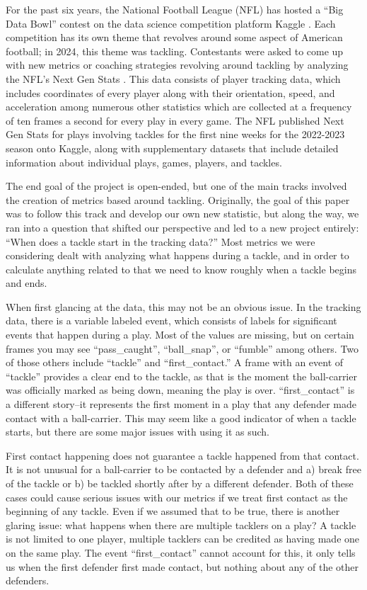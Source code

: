 \documentclass[
  12pt]{article}
\begin{document}
For the past six years, the National Football League (NFL) has hosted a
``Big Data Bowl'' contest on the data science competition platform
Kaggle \citep{BDB, Kaggle}. Each competition has its own theme that
revolves around some aspect of American football; in 2024, this theme
was tackling. Contestants were asked to come up with new metrics or
coaching strategies revolving around tackling by analyzing the NFL's
Next Gen Stats \citep{NextGenStats}. This data consists of player
tracking data, which includes coordinates of every player along with
their orientation, speed, and acceleration among numerous other
statistics which are collected at a frequency of ten frames a second for
every play in every game. The NFL published Next Gen Stats for plays
involving tackles for the first nine weeks for the 2022-2023 season onto
Kaggle, along with supplementary datasets that include detailed
information about individual plays, games, players, and tackles.

The end goal of the project is open-ended, but one of the main tracks
involved the creation of metrics based around tackling. Originally, the
goal of this paper was to follow this track and develop our own new
statistic, but along the way, we ran into a question that shifted our
perspective and led to a new project entirely: ``When does a tackle
start in the tracking data?'' Most metrics we were considering dealt
with analyzing what happens during a tackle, and in order to calculate
anything related to that we need to know roughly when a tackle begins
and ends.

When first glancing at the data, this may not be an obvious issue. In
the tracking data, there is a variable labeled event, which consists of
labels for significant events that happen during a play. Most of the
values are missing, but on certain frames you may see ``pass\_caught'',
``ball\_snap'', or ``fumble'' among others. Two of those others include
``tackle'' and ``first\_contact.'' A frame with an event of ``tackle''
provides a clear end to the tackle, as that is the moment the
ball-carrier was officially marked as being down, meaning the play is
over. ``first\_contact'' is a different story--it represents the first
moment in a play that any defender made contact with a ball-carrier.
This may seem like a good indicator of when a tackle starts, but there
are some major issues with using it as such.

First contact happening does not guarantee a tackle happened from that
contact. It is not unusual for a ball-carrier to be contacted by a
defender and a) break free of the tackle or b) be tackled shortly after
by a different defender. Both of these cases could cause serious issues
with our metrics if we treat first contact as the beginning of any
tackle. Even if we assumed that to be true, there is another glaring
issue: what happens when there are multiple tacklers on a play? A tackle
is not limited to one player, multiple tacklers can be credited as
having made one on the same play. The event ``first\_contact'' cannot
account for this, it only tells us when the first defender first made
contact, but nothing about any of the other defenders.
\end{document}
